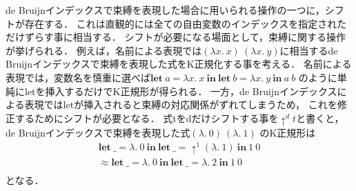 \documentclass[T]{compsoft}
\newcommand{\keyword}[1]{\mathbf{#1}}
\newcommand{\LET}{\keyword{let}}
\newcommand{\IN}{\keyword{in}}
\begin{document}
de Bruijnインデックスで束縛を表現した場合に用いられる操作の一つに，シフトが存在する．
これは直観的には全ての自由変数のインデックスを指定されただけずらす事に相当する．
シフトが必要になる場面として，束縛に関する操作が挙げられる．
例えば，名前による表現では$(\lambda x.~x)~(\lambda x.~y)$に相当するde Bruijnインデックスで束縛を表現した式をK正規化する事を考える．
名前による表現では，変数名を慎重に選べば$\LET~a = \lambda x.~x~\IN~\LET~b = \lambda x.~y~\IN~a~b$
のように単純にletを挿入するだけでK正規形が得られる．
一方，de Bruijnインデックスによる表現ではletが挿入されると束縛の対応関係がずれてしまうため，
これを修正するためにシフトが必要となる．
式tをdだけシフトする事を$\uparrow^d t$と書くと，de Bruijnインデックスで束縛を表現した式$(\lambda.~0)~(\lambda.~1)$
のK正規形は
\[ 
	\begin{array}{l}
		\LET~\_ = \lambda.~0~\IN~\LET~\_ = \uparrow^1(\lambda.~1)~\IN~1~0 \\
		\approx \LET~\_ = \lambda.~0~\IN~\LET~\_ = \lambda.~2~\IN~1~0 \\
	\end{array}
\]
となる．
\end{document}
